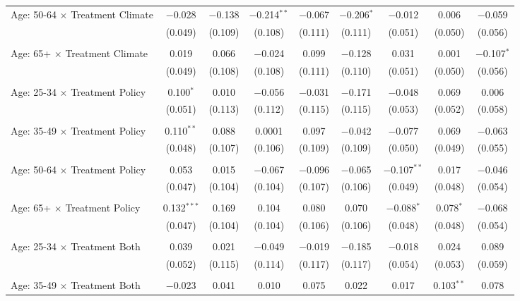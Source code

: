 \begin{tabular}{@{\extracolsep{5pt}}lcccccccc}
 Age: 50-64 $\times$ Treatment Climate & $-$0.028 & $-$0.138 & $-$0.214$^{**}$ & $-$0.067 & $-$0.206$^{*}$ & $-$0.012 & 0.006 & $-$0.059 \\ 
  & (0.049) & (0.109) & (0.108) & (0.111) & (0.111) & (0.051) & (0.050) & (0.056) \\ 
  & & & & & & & & \\ 
 Age: 65+ $\times$ Treatment Climate & 0.019 & 0.066 & $-$0.024 & 0.099 & $-$0.128 & 0.031 & 0.001 & $-$0.107$^{*}$ \\ 
  & (0.049) & (0.108) & (0.108) & (0.111) & (0.110) & (0.051) & (0.050) & (0.056) \\ 
  & & & & & & & & \\ 
 Age: 25-34 $\times$ Treatment Policy & 0.100$^{*}$ & 0.010 & $-$0.056 & $-$0.031 & $-$0.171 & $-$0.048 & 0.069 & 0.006 \\ 
  & (0.051) & (0.113) & (0.112) & (0.115) & (0.115) & (0.053) & (0.052) & (0.058) \\ 
  & & & & & & & & \\ 
 Age: 35-49 $\times$ Treatment Policy & 0.110$^{**}$ & 0.088 & 0.0001 & 0.097 & $-$0.042 & $-$0.077 & 0.069 & $-$0.063 \\ 
  & (0.048) & (0.107) & (0.106) & (0.109) & (0.109) & (0.050) & (0.049) & (0.055) \\ 
  & & & & & & & & \\ 
 Age: 50-64 $\times$ Treatment Policy & 0.053 & 0.015 & $-$0.067 & $-$0.096 & $-$0.065 & $-$0.107$^{**}$ & 0.017 & $-$0.046 \\ 
  & (0.047) & (0.104) & (0.104) & (0.107) & (0.106) & (0.049) & (0.048) & (0.054) \\ 
  & & & & & & & & \\ 
 Age: 65+ $\times$ Treatment Policy & 0.132$^{***}$ & 0.169 & 0.104 & 0.080 & 0.070 & $-$0.088$^{*}$ & 0.078$^{*}$ & $-$0.068 \\ 
  & (0.047) & (0.104) & (0.104) & (0.106) & (0.106) & (0.048) & (0.048) & (0.054) \\ 
  & & & & & & & & \\ 
 Age: 25-34 $\times$ Treatment Both & 0.039 & 0.021 & $-$0.049 & $-$0.019 & $-$0.185 & $-$0.018 & 0.024 & 0.089 \\ 
  & (0.052) & (0.115) & (0.114) & (0.117) & (0.117) & (0.054) & (0.053) & (0.059) \\ 
  & & & & & & & & \\ 
 Age: 35-49 $\times$ Treatment Both & $-$0.023 & 0.041 & 0.010 & 0.075 & 0.022 & 0.017 & 0.103$^{**}$ & 0.078 \\ 

\end{tabular}
